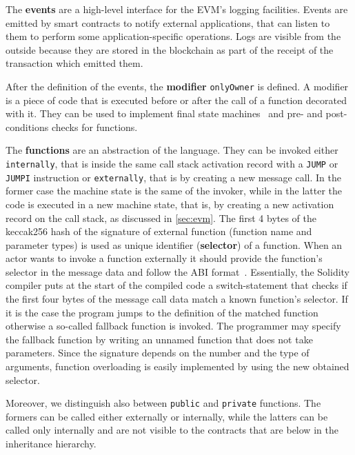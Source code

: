 The \textbf{events} are a high-level interface for the EVM's logging
facilities. Events are emitted by smart contracts to notify external
applications, that can listen to them to perform some application-specific
operations. Logs are visible from the outside because they are stored
in the blockchain as part of the receipt of the transaction which emitted them.

After the definition of the events, the \textbf{modifier} \verb|onlyOwner| is
defined. A modifier is a piece of code that is executed before or after the 
call of a function decorated with it. They can be used to implement final
state machines~\cite{bib:solidity-docs} and pre- and post-conditions checks for 
functions.

The \textbf{functions} are an abstraction of the language. They can be invoked
either \texttt{internally}, that is inside the same call stack activation record
with a \texttt{JUMP} or \texttt{JUMPI} instruction or \texttt{externally}, that
is by creating a new message call. In the former case the machine state is the
same of the invoker, while in the latter the code is executed in a new machine
state, that is, by creating a new activation record on the call stack, as
discussed in \autoref{sec:evm}. The first 4 bytes of the keccak256 hash of the
signature of external function (function name and parameter types) is used as
unique identifier (\textbf{selector}) of a function. When an actor wants to
invoke a function externally it should provide the function's selector in the
message data and follow the ABI format~\cite{bib:solidity-docs}. Essentially,
the Solidity compiler puts at the start of the compiled code a switch-statement
that checks if the first four bytes of the message call data match a known
function's selector. If it is the case the program jumps to the definition of
the matched function otherwise a so-called fallback function is invoked. The
programmer may specify the fallback function by writing an unnamed function
that does not take parameters. Since the signature depends on the number and
the type of arguments, function overloading is easily implemented by using the
new obtained selector.

Moreover, we distinguish also between \texttt{public} and \texttt{private}
functions. The formers can be called either externally or internally, while the
latters can be called only internally and are not visible to the contracts that
are below in the inheritance hierarchy.

